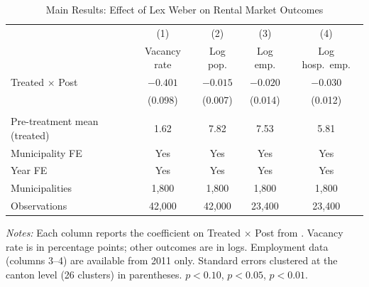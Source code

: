 \begin{table}[H]
\centering
\caption{Main Results: Effect of Lex Weber on Rental Market Outcomes}
\label{tab:main}
\begin{threeparttable}
\begin{tabular}{lcccc}
\toprule
& (1) & (2) & (3) & (4) \\
& Vacancy rate & Log pop. & Log emp. & Log hosp.\ emp. \\
\midrule
Treated $\times$ Post & $-0.401$\sym{***} & $-0.015$\sym{**} & $-0.020$ & $-0.030$\sym{**} \\
                       & (0.098) & (0.007) & (0.014) & (0.012) \\
\\
Pre-treatment mean (treated) & 1.62 & 7.82 & 7.53 & 5.81 \\
Municipality FE & Yes & Yes & Yes & Yes \\
Year FE & Yes & Yes & Yes & Yes \\
Municipalities & 1{,}800 & 1{,}800 & 1{,}800 & 1{,}800 \\
Observations & 42{,}000 & 42{,}000 & 23{,}400 & 23{,}400 \\
\bottomrule
\end{tabular}
\begin{tablenotes}[flushleft]
\small
\item \textit{Notes:} Each column reports the coefficient on Treated $\times$ Post from . Vacancy rate is in percentage points; other outcomes are in logs. Employment data (columns 3--4) are available from 2011 only. Standard errors clustered at the canton level (26 clusters) in parentheses. \sym{*} $p<0.10$, \sym{**} $p<0.05$, \sym{***} $p<0.01$.
\end{tablenotes}
\end{threeparttable}
\end{table}
